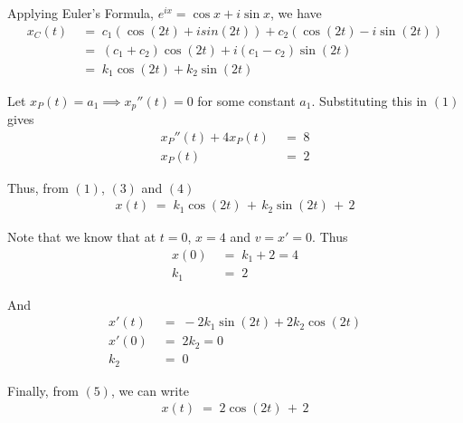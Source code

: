 \documentclass[11pt,reqno]{article}
\begin{document}
Applying Euler's Formula, $e^{ix} = \cos x + i\sin x$, we have
\begin{align*}
x_C(t) \;&=\; c_1(\cos(2t) + i sin(2t)) + c_2(\cos(2t) - i\sin(2t)) \\
\;&=\; (c_1 + c_2)\cos(2t) + i(c_1 - c_2)\sin(2t)     \\
\;&=\; k_1\cos(2t) + k_2\sin(2t) \tag{3}
\end{align*}

Let $x_P(t) = a_1 \implies x_p''(t) = 0$ for some constant $a_1$. Substituting this in $(1)$ gives
\begin{align*}
x_P''(t) + 4x_P(t) \;&=\; 8      \\
x_P(t) \;&=\; 2 \tag{4}
\end{align*}

Thus, from $(1)$, $(3)$ and $(4)$
\begin{align*}
\boxed{x(t) \;=\; k_1\cos(2t) \,+\, k_2\sin(2t) \,+\, 2} \tag{5}
\end{align*}

Note that we know that at $t = 0$, $x = 4$ and $v = x' = 0$. Thus
\begin{align*}
x(0) \;&=\; k_1 + 2 = 4  \\
k_1  \;&=\; 2
\end{align*}

And
\begin{align*}
x'(t) \;&=\; -2k_1\sin(2t) + 2k_2\cos(2t)    \\
x'(0) \;&=\; 2k_2 = 0                        \\
k_2   \;&=\; 0
\end{align*}

Finally, from $(5)$, we can write
\begin{align*}
\boxed{x(t) \;=\; 2\cos(2t) \,+\, 2}
\end{align*}
\end{document}
